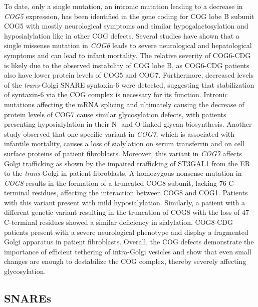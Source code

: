 To date, only a single mutation, an intronic mutation leading to a decrease in \emph{COG5} expression, has been identified in the gene coding for COG lobe B subunit COG5 with mostly neurological symptoms and similar hypogalactosylation and hyposialylation like in other COG defects\cite{palmigiano_maldi-ms_2017,fung_cog5-cdg_2012,paesold-burda_deficiency_2009,rymen_cog5-cdg_2012}. Several studies have shown that a single missense mutation in \emph{COG6} leads to severe neurological and hepatological symptoms and can lead to infant mortality\cite{lubbehusen_fatal_2010,huybrechts_deficiency_2012,shaheen_novel_2013}. The relative severity of COG6-CDG is likely due to the observed instability of COG lobe B, as COG6-CDG patients also have lower protein levels of COG5 and COG7. Furthermore, decreased levels of the \emph{trans}-Golgi SNARE syntaxin-6 were detected, suggesting that stabilization of syntaxin-6 via the COG complex is necessary for its function\cite{shaheen_novel_2013}. Intronic mutations affecting the mRNA splicing and ultimately causing the decrease of protein levels of COG7 cause similar glycosylation defects, with patients presenting hyposialylation in their N- and O-linked glycan biosynthesis\cite{morava_common_2007,ng_molecular_2007,zeevaert_new_2009}. Another study observed that one specific variant in \emph{COG7}, which is associated with infantile mortality\cite{spaapen_clinical_2005}, causes a loss of sialylation on serum transferrin and on cell surface proteins of patient fibroblasts\cite{wu_mutation_2004}. Moreover, this variant in \emph{COG7} affects Golgi trafficking as shown by the impaired trafficking of ST3GAL1 from the ER to the \emph{trans}-Golgi in patient fibroblasts. A homozygous nonsense mutation in \emph{COG8} results in the formation of a truncated COG8 subunit, lacking 76 C-terminal residues, affecting the interaction between COG8 and COG1. Patients with this variant present with mild hyposialylation\cite{foulquier_new_2007}. Similarly, a patient with a different genetic variant resulting in the truncation of COG8 with the loss of 47 C-terminal residues showed a similar deficiency in sialylation\cite{kranz_cog8_2007}. COG8-CDG patients present with a severe neurological phenotype and display a fragmented Golgi apparatus in patient fibroblasts. Overall, the COG defects demonstrate the importance of efficient tethering of intra-Golgi vesicles and show that even small changes are enough to destabilize the COG complex, thereby severely affecting glycosylation.

\subsection{SNAREs}

